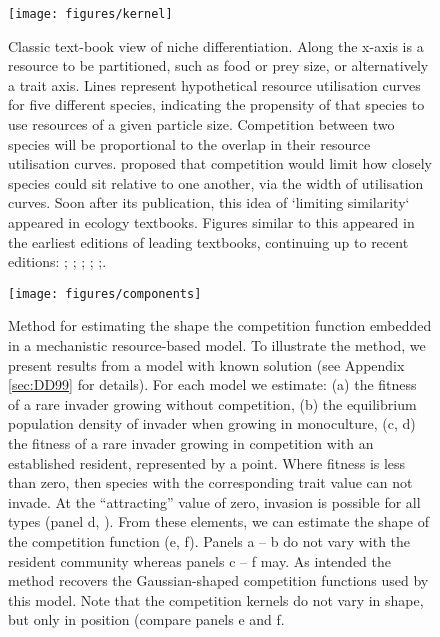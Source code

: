\documentclass[a4paper,11pt]{article}
\begin{document}
\begin{figure}[h]
  \centering
  \texttt{[image: figures/kernel]}
  \caption{Classic text-book view of niche differentiation.  Along the
    x-axis is a resource to be partitioned, such as food or prey size,
    or alternatively a trait axis.  Lines represent hypothetical
    resource utilisation curves for five different species, indicating
    the propensity of that species to use resources of a given particle size.
    Competition between two species will be proportional to
    the overlap in their resource utilisation
    curves. \citet{MacArthur-1967} proposed that competition would
    limit how closely species could sit relative to one another, via
    the width of utilisation curves. Soon after its publication,
    this idea of `limiting similarity` appeared in ecology textbooks.
    Figures similar to this appeared in the earliest
    editions of leading textbooks, continuing up to recent editions:
    \citet[Fig. 7.9]{Begon-1986}; \citet[Fig. 8.29]{Begon-2006};
    \citet[Fig. 12.2]{Krebs-1978}; \citet[????]{ Krebs-2013};
    \citet[Fig. 36.13]{Ricklefs-1973};\citet[Fig. 29.19]{Ricklefs-1999}.}
  \label{fig:competition-kernels}
\end{figure}

\begin{figure}[h]
 \centering
 \texttt{[image: figures/components]}
 \caption{Method for estimating the shape the competition function
   embedded in a mechanistic resource-based model. To illustrate the
   method, we present results from a model with known solution
   \citep{Dieckmann-1999} (see Appendix \ref{sec:DD99} for
   details). For each model we estimate: (a) the fitness of a rare
   invader growing without competition, (b) the equilibrium population
   density of invader when growing in monoculture, (c, d) the fitness
   of a rare invader growing in competition with an established
   resident, represented by a point.  Where fitness is less than zero,
   then species with the corresponding trait value can not invade.  At
   the ``attracting'' value of zero, invasion is possible for all
   types (panel d, \citealt{Dieckmann-1999}).  From these elements, we
   can estimate the shape of the competition function (e, f).  Panels
   a -- b do not vary with the resident community whereas panels c --
   f may.
   As intended the method recovers the Gaussian-shaped competition
   functions used by this model.  Note that the competition kernels do
   not vary in shape, but only in position (compare panels e and f.}
  \label{fig:components}
\end{figure}
\end{document}
